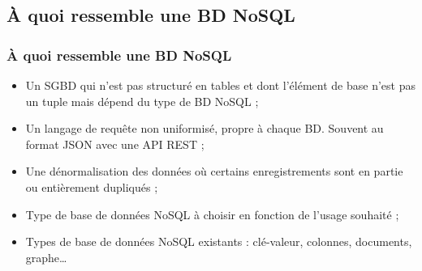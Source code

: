 	\subsection{À quoi ressemble une BD NoSQL}
	\begin{frame}
		\frametitle{À quoi ressemble une BD NoSQL}

		\begin{itemize}
			\item Un SGBD qui n'est pas structuré en tables et dont l'élément de base n'est pas un tuple mais dépend du type de BD NoSQL ;
			\item Un langage de requête non uniformisé, propre à chaque BD. Souvent au format JSON avec une API REST ;
			\item Une dénormalisation des données où certains enregistrements sont en partie ou entièrement dupliqués ;
			\item Type de base de données NoSQL à choisir en fonction de l'usage souhaité ;
			\item Types de base de données NoSQL existants : clé-valeur, colonnes, documents, graphe\dots
		\end{itemize}

	\end{frame}
